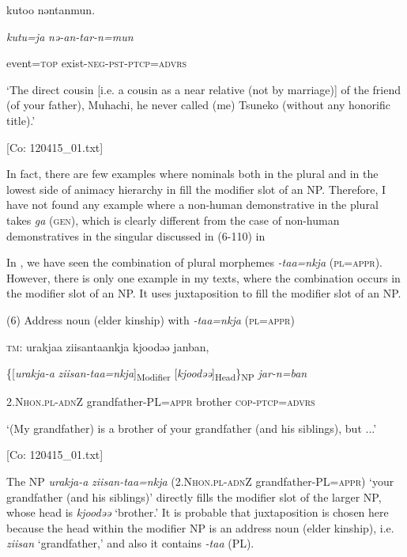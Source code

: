       kutoo  nəntanmun.

      \textit{kutu=ja}  \textit{nə-an-tar-n=mun}

      event=\textsc{top}  exist-\textsc{neg}-\textsc{pst}-\textsc{ptcp}=\textsc{advrs}

      ‘The direct cousin [i.e. a cousin as a near relative (not by marriage)] of the friend (of your father), Muhachi, he never called (me) Tsuneko (without any honorific title).’

      [Co: 120415\_01.txt]

In fact, there are few examples where nominals both in the plural and in the lowest side of animacy hierarchy in  fill the modifier slot of an NP. Therefore, I have not found any example where a non-human demonstrative in the plural takes \textit{ga} (\textsc{gen}), which is clearly different from the case of non-human demonstratives in the singular discussed in (6-110) in 

In , we have seen the combination of plural morphemes \textit{{}-taa=nkja} (\textsc{pl}=\textsc{appr}). However, there is only one example in my texts, where the combination occurs in the modifier slot of an NP. It uses juxtaposition to fill the modifier slot of an NP.

(6)  Address noun (elder kinship) with \textit{{}-taa=nkja} (\textsc{pl}=\textsc{appr})

  \textsc{tm}:  urakjaa  ziisantaankja  kjoodəə  janban,

    \{[\textit{urakja-a}  \textit{ziisan-taa=nkja}]\textsubscript{Modifier}  [\textit{kjoodəə}]\textsubscript{Head}\}\textsubscript{NP}  \textit{jar-n=ban}

    2.N\textsc{hon}.\textsc{pl}-\textsc{adn}Z  grandfather{}-PL=\textsc{appr}  brother  \textsc{cop}-\textsc{ptcp}=\textsc{advrs}

    ‘(My grandfather) is a brother of your grandfather (and his siblings), but ...’

    [Co: 120415\_01.txt]

The NP \textit{urakja-a} \textit{ziisan-taa=nkja} (2.N\textsc{hon}.\textsc{pl}-\textsc{adn}Z grandfather-PL=\textsc{appr}) ‘your grandfather (and his siblings)’ directly fills the modifier slot of the larger NP, whose head is \textit{kjoodəə} ‘brother.’ It is probable that juxtaposition is chosen here because the head within the modifier NP is an address noun (elder kinship), i.e. \textit{ziisan} ‘grandfather,’ and also it contains \textit{-taa} (PL).


